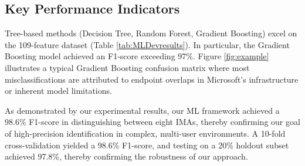 \documentclass[conference]{IEEEtran}
\begin{document}
\subsection{Key Performance Indicators}

Tree-based methods (Decision Tree, Random Forest, Gradient Boosting) excel on the 109-feature dataset (Table \ref{tab:MLDevresults}). In particular, the Gradient Boosting model achieved an F1-score exceeding 97\%.
Figure \ref{fig:example} illustrates a typical Gradient Boosting confusion matrix where most misclassifications are attributed to endpoint overlaps in Microsoft’s infrastructure or inherent model limitations.

As demonstrated by our experimental results, our ML framework achieved a 98.6\% F1-score in distinguishing between eight IMAs, thereby confirming our goal of high-precision identification in complex, multi-user environments. A 10-fold cross-validation yielded a 98.6\% F1-score, and testing on a 20\% holdout subset achieved 97.8\%, thereby confirming the robustness of our approach.
\end{document}

